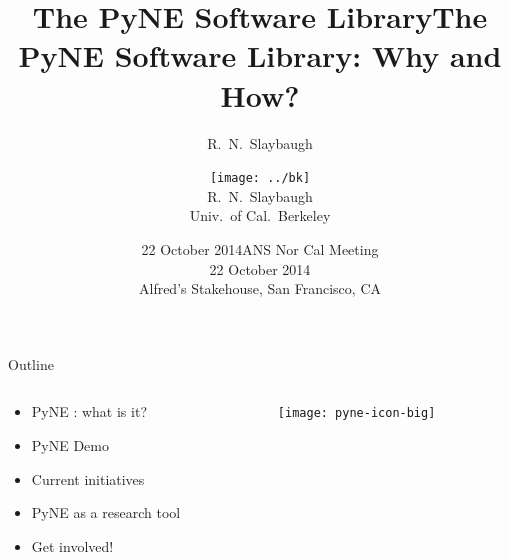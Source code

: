 \documentclass[xcolor=x11names,compress]{beamer}
\title{The PyNE Software Library}
\author{R.\ N.\ Slaybaugh}
\date{22 October 2014}
\renewcommand{\(}{\begin{columns}}
\renewcommand{\)}{\end{columns}}
\newcommand{\<}[1]{\begin{column}{#1}}
\renewcommand{\>}{\end{column}}
\begin{document}
\begin{frame}
\title{The PyNE Software Library: Why and How?}
\author{
        \texttt{[image: ../bk]}\\R.\ N.\ Slaybaugh \\ Univ.\ of Cal.\ Berkeley}

\date{ANS Nor Cal Meeting \\ 22 October 2014\\ Alfred's Stakehouse, San Francisco, CA}
\titlepage
\end{frame}

\begin{frame}{Outline}

	\begin{columns}
  	\begin{column}{0.4\textwidth}
	    \begin{itemize}
        \item PyNE \cite{pyne}: what is it?
        \item PyNE Demo
        \item Current initiatives
        \item PyNE as a research tool
        \item Get involved!
	    \end{itemize}
  	\end{column}
 	\begin{column}{0.5\textwidth}
 	   \begin{center}
 	   \begin{figure}
       \texttt{[image: pyne-icon-big]}
	   \end{figure}
 	   \end{center}
  	\end{column}
	\end{columns}

\end{frame}

\end{document}
